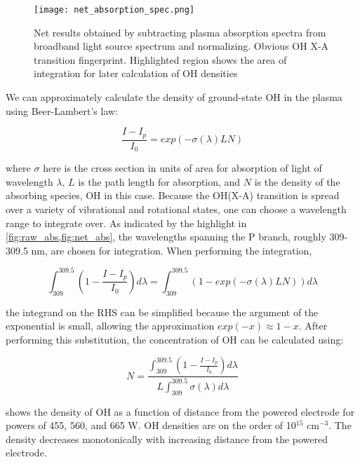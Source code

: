 \begin{figure}[htbp]
  \centering
  \texttt{[image: net\_absorption\_spec.png]}
  \caption{Net results obtained by subtracting plasma absorption spectra from broadband light source spectrum and normalizing. Obvious OH X-A transition fingerprint. Highlighted region shows the area of integration for later calculation of OH densities}
  \label{fig:net_abs}
\end{figure}

We can approximately calculate the density of ground-state OH in the plasma using Beer-Lambert's law:

\begin{equation}
  \frac{I-I_p}{I_0} = exp\left(-\sigma(\lambda) L N\right)
  \label{eq:beer-lambert}
\end{equation}

where $\sigma$ here is the cross section in units of area for absorption of light of wavelength $\lambda$, $L$ is the path length for absorption, and $N$ is the density of the absorbing species, OH in this case. Because the OH(X-A) transition is spread over a variety of vibrational and rotational states, one can choose a wavelength range to integrate over. As indicated by the highlight in \cref{fig:raw_abs,fig:net_abs}, the wavelengths spanning the P branch, roughly 309-309.5 nm, are chosen for integration. When performing the integration,

\begin{equation}
  \int_{309}^{309.5} \left(1 - \frac{I-I_p}{I_0}\right)d\lambda = \int_{309}^{309.5}\left(1 - exp\left(-\sigma(\lambda) L N\right)\right)d\lambda
  \label{eq:int_unsimplified}
\end{equation}

the integrand on the RHS can be simplified because the argument of the exponential is small, allowing the approximation $exp(-x)\approx 1 - x$. After performing this substitution, the concentration of OH can be calculated using:

\begin{equation}
  N = \frac{\int_{309}^{309.5}\left(1 - \frac{I-I_p}{I_0}\right)d\lambda}{L\int_{309}^{309.5}\sigma(\lambda)d\lambda}
  \label{eq:int_simp}
\end{equation}

 shows the density of OH as a function of distance from the powered electrode for powers of 455, 560, and 665 W. OH densities are on the order of 10$^{15}$ cm$^{-3}$. The density decreases monotonically with increasing distance from the powered electrode.

